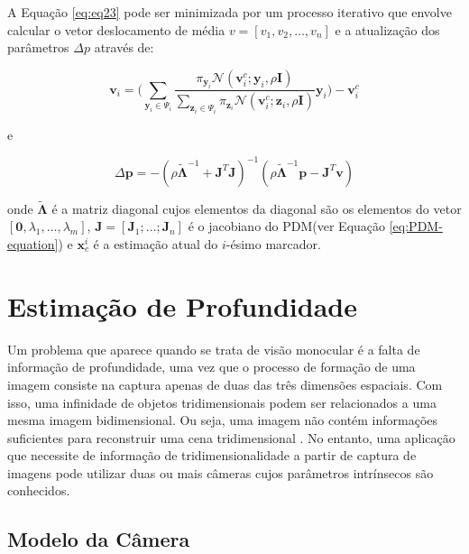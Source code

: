 {A Equação \ref{eq:eq23} pode ser minimizada por um processo iterativo que envolve calcular o vetor deslocamento de média $v = [v_1, v_2, \ldots, v_n]$ e a atualização dos parâmetros $\Delta p$ através de:

\begin{equation}
\textbf{v}_i = \Bigg(\sum\limits_{\textbf{y}_i \in \Psi_i} \frac{\pi_{\textbf{y}_i}\mathcal{N}(\textbf{v}_i^c;\textbf{y}_i,\rho\textbf{I})}{\sum\nolimits_{\textbf{z}_i \in \Psi_i} \pi_{\textbf{z}_i}\mathcal{N}(\textbf{v}_i^c;\textbf{z}_i,\rho\textbf{I})
}\textbf{y}_i\Bigg) - \textbf{v}_i^c
\label{eq:alg3}
\end{equation}

e

\begin{equation}
\Delta\textbf{p} = -(\rho\tilde{\mathbf{\Lambda}}^{-1} + \textbf{J}^T\textbf{J})^{-1}(\rho\tilde{\mathbf{\Lambda}}^{-1}\textbf{p} - \textbf{J}^T\textbf{v})
\label{eq:alg4}
\end{equation}

onde $\tilde{\mathbf{\Lambda}}$ é a matriz diagonal cujos elementos da diagonal são os elementos do vetor $[\mathbf{0}, \lambda_1, \ldots, \lambda_m]$, $\mathbf{J} = [\mathbf{J}_1; \ldots; \mathbf{J}_n]$ é o jacobiano do PDM(ver Equação \ref{eq:PDM-equation}) 
e $\mathbf{x}_c^i$ é a estimação atual do $i$-ésimo marcador.




               
\section{Estimação de Profundidade}

Um problema que aparece quando se trata de visão monocular é a falta de informação de profundidade, uma vez que o processo de formação de uma imagem consiste na captura apenas de duas das três dimensões espaciais. Com isso, uma infinidade de objetos tridimensionais podem ser relacionados a uma mesma imagem bidimensional. Ou seja, uma imagem não contém informações suficientes para reconstruir uma cena tridimensional \cite{bolles1987epipolar}. No entanto, uma aplicação que necessite de informação de tridimensionalidade a partir de captura de imagens pode utilizar duas ou mais câmeras cujos parâmetros intrínsecos são conhecidos.

\subsection{Modelo da Câmera}

}
